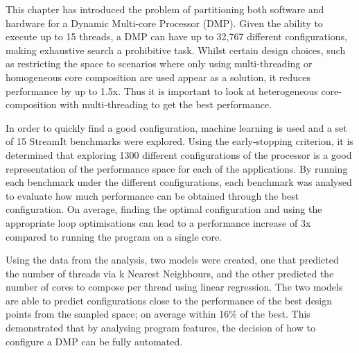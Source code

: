 This chapter has introduced the problem of partitioning both software and hardware for a Dynamic Multi-core Processor (DMP).
Given the ability to execute up to 15 threads, a DMP can have up to 32,767 different configurations, making exhaustive search a prohibitive task.
Whilst certain design choices, such as restricting the space to scenarios where only using multi-threading or homogeneous core composition are used appear as a solution, it reduces performance by up to 1.5x.
Thus it is important to look at heterogeneous core-composition with multi-threading to get the best performance.

In order to quickly find a good configuration, machine learning is used and a set of 15 StreamIt benchmarks were explored.
Using the early-stopping criterion, it is determined that exploring 1300 different configurations of the processor is a good representation of the performance space for each of the applications.
By running each benchmark under the different configurations, each benchmark was analysed to evaluate how much performance can be obtained through the best configuration.
On average, finding the optimal configuration and using the appropriate loop optimisations can lead to a performance increase of 3x compared to running the program on a single core.

Using the data from the analysis, two models were created, one that predicted the number of threads via k Nearest Neighbours, and the other predicted the number of cores to compose per thread using linear regression.
The two models are able to predict configurations close to the performance of the best design points from the sampled space; on average within 16\% of the best.
This demonstrated that by analysing program features, the decision of how to configure a DMP can be fully automated.

